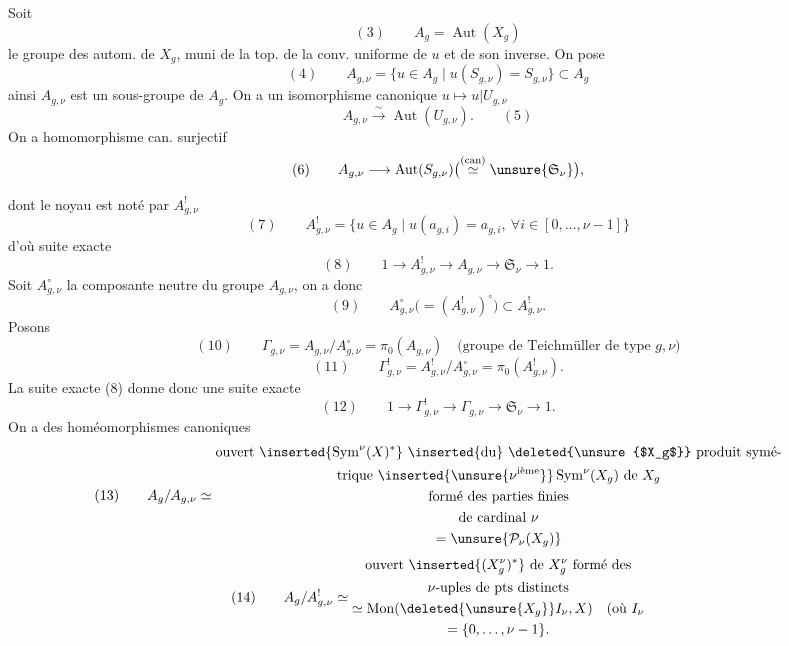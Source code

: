 Soit
\[
(3)\qquad A_g=\operatorname{Aut}(X_g)
\]
le groupe des autom. de $X_g$, muni de la
top. de la conv. uniforme de $u$ et de son
inverse. On pose
\[
(4)\qquad A_{g,\nu}=\{u\in A_g\mid u(S_{g,\nu})=S_{g,\nu}\}\subset A_g
\]
ainsi $A_{g,\nu}$ est un sous-groupe de $A_g$. On
a un isomorphisme canonique $u\mapsto u|U_{g,\nu}$
\[
A_{g,\nu}\xrightarrow{\sim}\operatorname{Aut}(U_{g,\nu}).\qquad(5)
\]
 On a  homomorphisme can. surjectif
\[
(6)\qquad A_{g,\nu}\longrightarrow\operatorname{Aut}(S_{g,\nu})
\bigl(\overset{\text{(can)}}{\simeq}\unsure{\mathfrak S_\nu}\bigr),
\]

dont le noyau est noté par $A_{g,\nu}^!$
\[
(7)\qquad A_{g,\nu}^!=\{u\in A_g\mid u(a_{g,i})=a_{g,i},\ \forall i\in[0,\ldots,\nu-1]\}
\]
d'où suite exacte
\[
(8)\qquad 1\longrightarrow A_{g,\nu}^!\longrightarrow A_{g,\nu}
\longrightarrow\mathfrak S_\nu\longrightarrow1.
\]
Soit $A_{g,\nu}^{\circ}$ la composante neutre du groupe
$A_{g,\nu}$, on a donc
\[
(9)\qquad A_{g,\nu}^{\circ}\bigl(=(A_{g,\nu}^!)^{\circ}\bigr)\subset A_{g,\nu}^!.
\]
Posons
\[
(10)\qquad \Gamma_{g,\nu}=A_{g,\nu}/A_{g,\nu}^{\circ}=\pi_0(A_{g,\nu})
\quad\text{(groupe de Teichmüller de type }g,\nu\text{)}
\]
\[
(11)\qquad \Gamma_{g,\nu}^!=A_{g,\nu}^!/A_{g,\nu}^{\circ}=\pi_0(A_{g,\nu}^!).
\]
La suite exacte (8) donne donc une suite
exacte
\[
(12)\qquad 1\longrightarrow\Gamma_{g,\nu}^!\longrightarrow\Gamma_{g,\nu}
\longrightarrow\mathfrak S_\nu\longrightarrow1.
\]
On a des homéomorphismes canoniques
\[
(13)\qquad A_g/A_{g,\nu}\simeq
\begin{gathered}
\text{ouvert }\inserted{\operatorname{Sym}^{\nu}(X)^*}\text{ \inserted{du} \deleted{\unsure{$X_g$}} produit symé-}\\
\text{trique }\inserted{\unsure{\nu^{\text{ième}}}}\operatorname{Sym}^{\nu}(X_g)\text{ de }X_g\\
\text{formé des parties finies}\\
\text{de cardinal }\nu\\
=\unsure{\mathcal P_\nu(X_g)}
\end{gathered}
\]
\[
(14)\qquad A_g/A_{g,\nu}^!\simeq
\begin{gathered}
\text{ouvert }\inserted{(X_g^{\nu})^*}\text{ de }X_g^{\nu}\text{ formé des}\\
\nu\text{-uples de pts distincts}\\
\simeq\operatorname{Mon}(\deleted{\unsure{X_g}}I_\nu,X)\quad\text{(où }I_\nu\\
=\{0,\ldots,\nu-1\}.
\end{gathered}
\]

